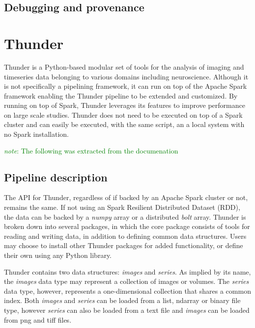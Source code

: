 \documentclass{report}
\newcommand{\note}[1]{\textcolor{green}{\textit{note}: #1}}
\begin{document}
        \subsection{Debugging and provenance}
    \section{Thunder}

        Thunder is a Python-based modular set of tools for the analysis of imaging and timeseries data belonging
        to various domains including neuroscience. Although it is not specifically a pipelining framework, 
        it can run on top of the Apache
        Spark framework enabling the Thunder pipeline to be extended and customized. By running on top of Spark,
        Thunder leverages its features to improve performance on large scale studies. Thunder does not need to
        be executed on top of a Spark cluster and can easily be executed, with the same script, an a local system
        with no Spark installation. 

        \note{The following was extracted from the documenation}
        \subsection{Pipeline description}
        The API for Thunder, regardless of if backed by an Apache Spark cluster or not, remains the same. If not 
        using an Spark Resilient Distributed Dataset (RDD), the data can be backed by a \textit{numpy} array or a
        distributed \textit{bolt} array. Thunder is broken down into several packages, in which the core package
        consists of tools for reading and writing data, in addition to defining common data structures. Users may
        choose to install other Thunder packages for added functionality, or define their own using any Python
        library.        
 

        Thunder contains two data structures: \textit{images} and \textit{series}. As implied by its name, the 
        \textit{images} data type may represent a collection of images or volumes. 
        The \textit{series} data type,
        however, represents a one-dimensional collection that shares a common index. Both \textit{images} and 
        \textit{series} can be loaded from a list, ndarray or binary file type, however \textit{series} can also 
        be loaded from a text file and \textit{images} can be loaded from png and tiff files.
\end{document}
